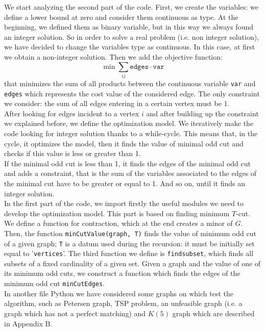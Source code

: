 We start analyzing the second part of the code. First, we create the variables: we define a lower bound at zero and consider them continuous as type. At the beginning, we defined them as binary variable, but in this way we always found an integer solution. So in order to solve a real problem (i.e. non integer solution), we have decided to change the variables type as continuous. In this case, at first we obtain a non-integer solution. 
Then we add the objective function: 
\[
\min \sum_{ij} \texttt{edges} \cdot \texttt{var}
\]
that minimizes the sum of all products between the continuous variable \texttt{var} and \texttt{edges} which represents the cost value of the considered edge. The only constraint we consider: the sum of all edges entering in a certain vertex must be 1. \\
After looking for edges incident to a vertex $i$ and after building up the constraint we explained before, we define the optimization model. We iteratively make the code looking for integer solution thanks to a while-cycle. This means that, in the cycle, it optimizes the model, then it finds the value of minimal odd cut and checks if this value is less or greater than 1. \\
If the minimal odd cut is less than 1, it finds the edges of the minimal odd cut and adds a constraint, that is the sum of the variables associated to the edges of the minimal cut have to be greater or equal to 1.  And so on, until it finds an integer solution. \\

In the first part of the code, we import firstly the useful modules we need to develop the optimization model. This part is based on finding minimum $T$-cut.
We define a function for contraction, which at the end creates a minor of $G$. Then, the function \texttt{minCutValue(graph, T)} finds the value of minimum odd cut  of a given graph; \texttt{T} is a datum used during the recursion: it must be initially set equal to '\texttt{vertices}'. The third function we define is \texttt{findsubset}, which finds all subsets of a fixed cardinality of a given set. Given a graph and the value of one of its minimum odd cuts, we construct a function which finds the edges of the minimum odd cut \texttt{minCutEdges}.   \\

In another file Python we have considered some graphs on which test the algorithm, such as Petersen graph, TSP problem, an unfeasible graph (i.e. a graph which has not a perfect matching) and $K(5)$ graph which are described in Appendix B. 
